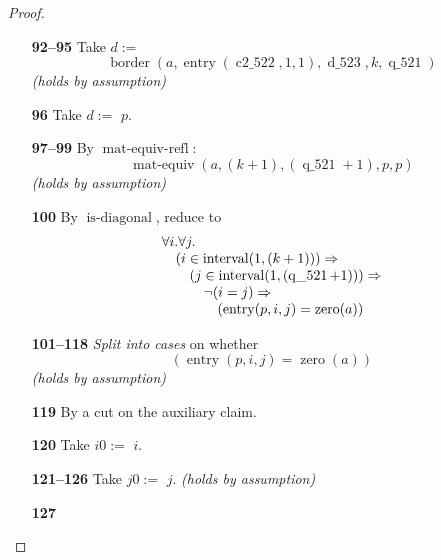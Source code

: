 \documentclass[11pt]{article}
\theoremstyle{plain}
\begin{document}
\begin{proof}
\begin{itemize}[leftmargin=2.8em, itemsep=4pt, parsep=1pt]
  \item[\textbf{92--95}] Take $d :=$
\begin{equation*}
\operatorname{border}(a, \operatorname{entry}(\operatorname{c2\_522}, 1, 1), \operatorname{d\_523}, k, \operatorname{q\_521})
\end{equation*}
  \emph{(holds by assumption)}
  \item[\textbf{96}] Take $d :=$ $p$.
  \item[\textbf{97--99}] By $\operatorname{mat\text{-}equiv\text{-}refl}$:
\begin{equation*}
\operatorname{mat\text{-}equiv}(a, (k + 1), (\operatorname{q\_521} + 1), p, p)
\end{equation*}
  \emph{(holds by assumption)}
  \item[\textbf{100}] By $\operatorname{is\text{-}diagonal}$, reduce to
\begin{equation*}
\begin{array}{@{}l@{}} \forall i. \forall j. \\ \quad (i \in \operatorname{interval}(1, (k + 1))) \Rightarrow  \\ \quad \quad (j \in \operatorname{interval}(1, (\operatorname{q\_521} + 1))) \Rightarrow  \\ \quad \quad \quad \neg (i = j) \Rightarrow  \\ \quad \quad \quad \quad (\operatorname{entry}(p, i, j) = \operatorname{zero}(a)) \end{array}
\end{equation*}

  \item[\textbf{101--118}] \emph{Split into cases} on whether
\begin{equation*}
(\operatorname{entry}(p, i, j) = \operatorname{zero}(a))
\end{equation*}
  \emph{(holds by assumption)}
  \item[\textbf{119}] By a cut on the auxiliary claim.
  \item[\textbf{120}] Take $\mathit{i0} :=$ $i$.
  \item[\textbf{121--126}] Take $\mathit{j0} :=$ $j$.  \emph{(holds by assumption)}
  \item[\textbf{127}] 
\end{itemize}
\end{proof}
\end{document}
